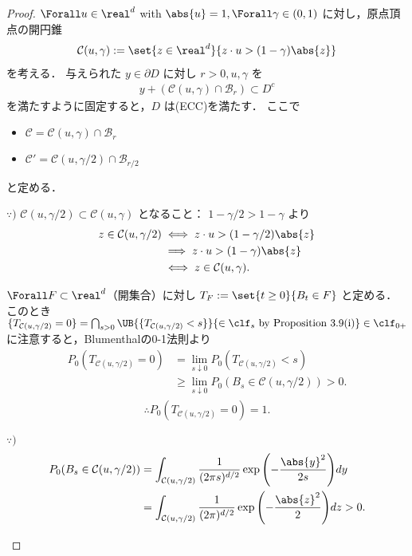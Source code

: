 \documentclass{jsarticle}
\begin{document}
\begin{proof}
    $\Forall u\in\real^d$ with $\abs{u}=1, \Forall \gamma\in(0, 1)$ に対し，原点頂点の開円錐
    \begin{align}
        \mathcal{C}(u, \gamma)
        := \set{z\in\real^d}{z\cdot u>(1-\gamma)\abs{z}}
    \end{align}
    を考える．
    与えられた $y\in\partial D$ に対し $r>0, u, \gamma$ を
    \begin{align}
        y+(\mathcal{C}(u, \gamma)\cap\mathcal{B}_{r})\subset D^c
    \end{align}
    を満たすように固定すると，$D$ は(ECC)を満たす．
    ここで
    \begin{itemize}
        \item $\mathcal{C}=\mathcal{C}(u, \gamma)\cap\mathcal{B}_{r}$
        \item $\mathcal{C}'=\mathcal{C}(u, \gamma/2)\cap\mathcal{B}_{r/2}$
    \end{itemize}
    と定める．
    
    \begin{screen}
        $\because)$
        $\mathcal{C}(u, \gamma/2)\subset \mathcal{C}(u, \gamma)$ となること：
        $1-\gamma/2>1-\gamma$ より
        \begin{align}
            z\in\mathcal{C}(u, \gamma/2)
            &\iff z\cdot u>(1-\gamma/2)\abs{z} \\
            &\implies z\cdot u>(1-\gamma)\abs{z} \\
            &\iff z\in\mathcal{C}(u, \gamma).
        \end{align}
    \end{screen}

    $\Forall F\subset \real^d$（開集合）に対し $T_F:=\set{t\ge0}{B_t\in F}$ と定める．
    このとき $\{T_{\mathcal{C}(u, \gamma/2)}=0\}=\bigcap_{s>0}\UB{\{T_{\mathcal{C}(u, \gamma/2)}<s\}}{\in\clf_s\text{ by Proposition 3.9(i)}}\in\clf_{0+}$ に注意すると，Blumenthalの0-1法則より
    \begin{align}
        P_0(T_{\mathcal{C}(u, \gamma/2)}=0)
        &= \lim_{s\downarrow0}P_0(T_{\mathcal{C}(u, \gamma/2)}<s) \\
        &\ge \lim_{s\downarrow0}P_0(B_s\in\mathcal{C}(u, \gamma/2))>0.
    \end{align}
    \begin{gather}
        \therefore 
        P_0(T_{\mathcal{C}(u, \gamma/2)}=0) = 1.
    \end{gather}
    
    \begin{screen}
        $\because)$
        \begin{align}
            P_0(B_s\in\mathcal{C}(u, \gamma/2))
            &= \int_{\mathcal{C}(u, \gamma/2)}\frac{1}{(2\pi s)^{d/2}}\exp{\left(-\frac{\abs{y}^2}{2s}\right)}dy \\
            &= \int_{\mathcal{C}(u, \gamma/2)}\frac{1}{(2\pi)^{d/2}}\exp{\left(-\frac{\abs{z}^2}{2}\right)}dz > 0.
        \end{align}
    \end{screen}
    

\end{proof}
\end{document}
